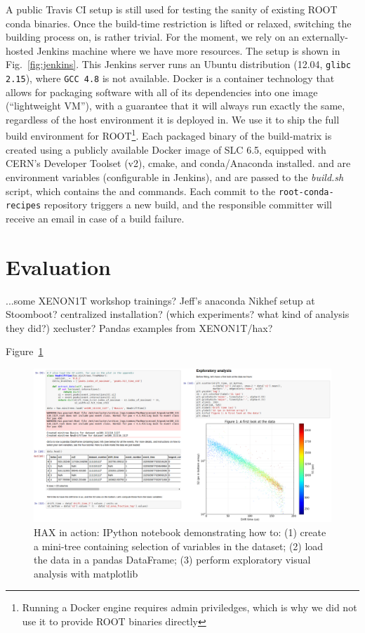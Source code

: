 \documentclass[a4paper]{jpconf}
\begin{document}
A public Travis CI setup is still used for testing the sanity of existing ROOT conda binaries. 
Once the build-time restriction is lifted or relaxed, switching the building process on, is rather trivial.
For the moment, we rely on an externally-hosted Jenkins machine where we have more resources.
The setup is shown in Fig.~\ref{fig:jenkins}. 
This Jenkins server runs an Ubuntu distribution (12.04, \texttt{glibc 2.15}), where \texttt{GCC 4.8} is not available.
Docker is a container technology that allows for packaging software with all of its dependencies into one image (``lightweight VM''), 
with a guarantee that it will always run exactly the same, regardless of the host environment it is deployed in.
We use it to ship the full build environment for ROOT\footnote{Running a Docker engine requires admin priviledges, which is why we did not use it to provide ROOT binaries directly}.
Each packaged binary of the build-matrix is created using a publicly available Docker image of SLC 6.5, equipped with CERN's Developer Toolset 
(v2), cmake, and conda/Anaconda installed.
 and  are environment variables 
(configurable in Jenkins), and are passed to the \textit{build.sh} script, which contains the  and 
commands. Each commit to the \texttt{root-conda-recipes} repository triggers a new build, and the responsible committer will 
receive an email in case of a build failure.

\section{Evaluation}
...some XENON1T workshop trainings?
Jeff's anaconda Nikhef setup at Stoomboot? centralized installation? (which experiments? what kind of analysis they did?) xecluster?
Pandas examples from XENON1T/hax?

Figure~\ref{fig:hax_in_action}
 
\begin{landscape}
\begin{figure}[ht]
\begin{center}
\includegraphics[width=1.05\linewidth]{./graphics/hax_in_action.png}
\caption{HAX in action: IPython notebook demonstrating how to: (1) create a mini-tree containing selection of variables in the dataset; (2) load the data in a pandas DataFrame; (3) perform exploratory visual analysis with matplotlib }
\label{fig:hax_in_action}
\end{center}
\end{figure}
\end{landscape}
\end{document}
